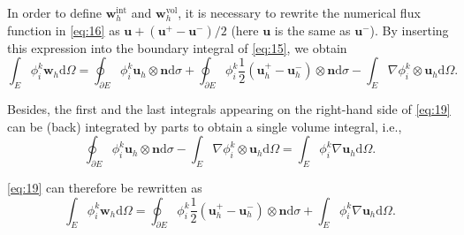 \documentclass{develop-note}
\begin{document}
In order to define $\mathbf{w}_{h}^{\mathrm{int}}$ and $\mathbf{w}_{h}^{\mathrm{vol}}$, it is necessary to rewrite the numerical flux function in \autoref{eq:16} as $\mathbf{u}+(\mathbf{u}^{+}-\mathbf{u}^{-})/2$ (here $\mathbf{u}$ is the same as $\mathbf{u}^{-}$). By inserting this expression into the boundary integral of \autoref{eq:15}, we obtain
\begin{equation}
  \label{eq:19}
  \int_{E}\phi_{i}^{k}\mathbf{w}_{h}\mathrm{d}\Omega=\oint_{\partial E}\phi_{i}^{k}\mathbf{u}_{h}\otimes\mathbf{n}\mathrm{d}\sigma+\oint_{\partial E}\phi_{i}^{k}\dfrac{1}{2}(\mathbf{u}_{h}^{+}-\mathbf{u}_{h}^{-})\otimes\mathbf{n}\mathrm{d}\sigma-\int_{E}\nabla\phi_{i}^{k}\otimes\mathbf{u}_{h}\mathrm{d}\Omega.
\end{equation}

Besides, the first and the last integrals appearing on the right-hand side of \autoref{eq:19} can be (back) integrated by parts to obtain a single volume integral, i.e.,
\begin{equation}
  \oint_{\partial E}\phi_{i}^{k}\mathbf{u}_{h}\otimes\mathbf{n}\mathrm{d}\sigma-\int_{E}\nabla\phi_{i}^{k}\otimes\mathbf{u}_{h}\mathrm{d}\Omega=\int_{E}\phi_{i}^{k}\nabla\mathbf{u}_{h}\mathrm{d}\Omega.
\end{equation}

\autoref{eq:19} can therefore be rewritten as
\begin{equation}
  \label{eq:21}
  \int_{E}\phi_{i}^{k}\mathbf{w}_{h}\mathrm{d}\Omega=\oint_{\partial E}\phi_{i}^{k}\dfrac{1}{2}(\mathbf{u}_{h}^{+}-\mathbf{u}_{h}^{-})\otimes\mathbf{n}\mathrm{d}\sigma+\int_{E}\phi_{i}^{k}\nabla\mathbf{u}_{h}\mathrm{d}\Omega.
\end{equation}
\end{document}
